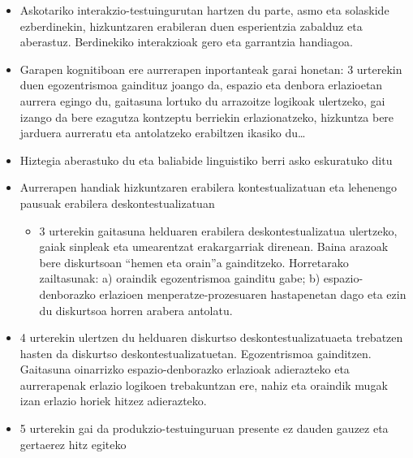 \documentclass[
]{book}
\providecommand{\tightlist}{%
  \setlength{\itemsep}{0pt}\setlength{\parskip}{0pt}}
\begin{document}
\begin{itemize}
\tightlist
\item
  Askotariko interakzio-testuingurutan hartzen du parte, asmo eta solaskide ezberdinekin, hizkuntzaren erabileran duen esperientzia zabalduz eta aberastuz. Berdinekiko interakzioak gero eta garrantzia handiagoa.
\item
  Garapen kognitiboan ere aurrerapen inportanteak garai honetan: 3 urterekin duen egozentrismoa gaindituz joango da, espazio eta denbora erlazioetan aurrera egingo du, gaitasuna lortuko du arrazoitze logikoak ulertzeko, gai izango da bere ezagutza kontzeptu berriekin erlazionatzeko, hizkuntza bere jarduera aurreratu eta antolatzeko erabiltzen ikasiko du\ldots{}
\item
  Hiztegia aberastuko du eta baliabide linguistiko berri asko eskuratuko ditu
\item
  Aurrerapen handiak hizkuntzaren erabilera kontestualizatuan eta lehenengo pausuak erabilera deskontestualizatuan

  \begin{itemize}
  \tightlist
  \item
    3 urterekin gaitasuna helduaren erabilera deskontestualizatua ulertzeko, gaiak sinpleak eta umearentzat erakargarriak direnean. Baina arazoak bere diskurtsoan ``hemen eta orain''a gainditzeko. Horretarako zailtasunak: a) oraindik egozentrismoa gainditu gabe; b) espazio-denborazko erlazioen menperatze-prozesuaren hastapenetan dago eta ezin du diskurtsoa horren arabera antolatu.
  \end{itemize}
\item
  4 urterekin ulertzen du helduaren diskurtso deskontestualizatuaeta trebatzen hasten da diskurtso deskontestualizatuetan. Egozentrismoa gainditzen. Gaitasuna oinarrizko espazio-denborazko erlazioak adierazteko eta aurrerapenak erlazio logikoen trebakuntzan ere, nahiz eta oraindik mugak izan erlazio horiek hitzez adierazteko.
\item
  5 urterekin gai da produkzio-testuinguruan presente ez dauden gauzez eta gertaerez hitz egiteko
\end{itemize}
\end{document}
